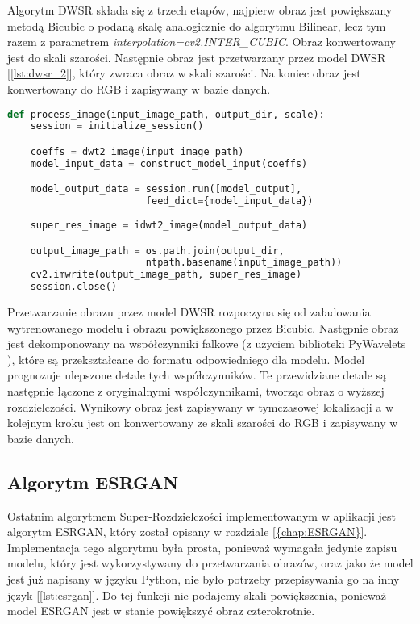 Algorytm DWSR składa się z trzech etapów, najpierw obraz jest powiększany metodą Bicubic o podaną skalę analogicznie do algorytmu Bilinear, lecz tym razem z parametrem \textit{interpolation=cv2.INTER\_CUBIC}. Obraz konwertowany jest do skali szarości. Następnie obraz jest przetwarzany przez model DWSR [\ref{lst:dwsr_2}], który zwraca obraz w skali szarości. Na koniec obraz jest konwertowany do RGB i zapisywany w bazie danych.


\begin{lstlisting}[language=Python, caption=Przetwarzanie przez model DWSR., label={lst:dwsr_2}]    
def process_image(input_image_path, output_dir, scale):
    session = initialize_session()

    coeffs = dwt2_image(input_image_path)
    model_input_data = construct_model_input(coeffs)

    model_output_data = session.run([model_output], 
                        feed_dict={model_input_data})
    
    super_res_image = idwt2_image(model_output_data)

    output_image_path = os.path.join(output_dir, 
                        ntpath.basename(input_image_path))
    cv2.imwrite(output_image_path, super_res_image)        
    session.close()

\end{lstlisting}

Przetwarzanie obrazu przez model DWSR rozpoczyna się od załadowania wytrenowanego modelu i obrazu powiększonego przez Bicubic. Następnie obraz jest dekomponowany na współczynniki falkowe (z użyciem biblioteki PyWavelets \cite{pywavelets}), które są przekształcane do formatu odpowiedniego dla modelu. Model prognozuje ulepszone detale tych współczynników. 
Te przewidziane detale są następnie łączone z oryginalnymi współczynnikami, tworząc obraz o wyższej rozdzielczości. Wynikowy obraz jest zapisywany w tymczasowej lokalizacji a w kolejnym kroku jest on konwertowany ze skali szarości do RGB i zapisywany w bazie danych.


\subsection*{Algorytm ESRGAN}

Ostatnim algorytmem Super-Rozdzielczości implementowanym w aplikacji jest algorytm ESRGAN, który został opisany w rozdziale \ref{{chap:ESRGAN}}.
Implementacja tego algorytmu była prosta, ponieważ wymagała jedynie zapisu modelu, który jest wykorzystywany do przetwarzania obrazów, oraz jako że model jest już napisany w języku Python, nie było potrzeby przepisywania go na inny język [\ref{lst:esrgan}]. Do tej funkcji nie podajemy skali powiększenia, ponieważ model ESRGAN jest w stanie powiększyć obraz czterokrotnie.

